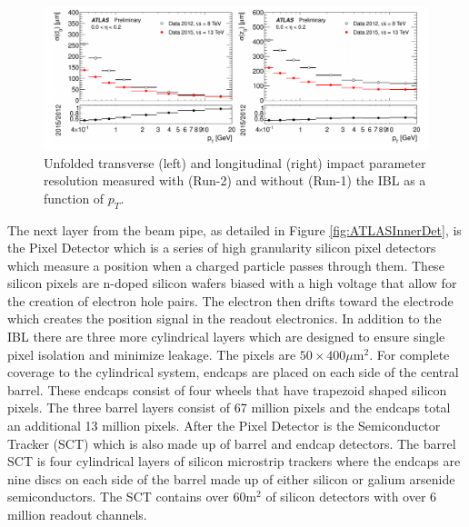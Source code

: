 \begin{figure}[ht!]
	\centering
	\includegraphics[width=\columnwidth]{../ThesisImages/LHCImages/tracking.png}
	\caption[Unfolded transverse (left) and longitudinal (right) impact parameter resolutions measured with (Run-2) and without (Run-1) the IBL as a function of $p_T$.]{Unfolded transverse (left) and longitudinal (right) impact parameter resolution measured with (Run-2) and without (Run-1) the IBL as a function of $p_T$\cite{Takubo:2017wvt}.
	}
	\label{fig:impParamIBL}
\end{figure}

The next layer from the beam pipe, as detailed in Figure \ref{fig:ATLASInnerDet}, is the Pixel Detector which is a series of high granularity silicon pixel detectors which measure a position when a charged particle passes through them.  These silicon pixels are n-doped silicon wafers biased with a high voltage that allow for the creation of electron hole pairs.  The electron then drifts toward the electrode which creates the position signal in the readout electronics.  In addition to the IBL there are three more cylindrical layers which are designed to ensure single pixel isolation and minimize leakage.  The pixels are $50 \times 400\mu\text{m}^2$.  For complete coverage to the cylindrical system, endcaps are placed on each side of the central barrel.  These endcaps consist of four wheels that have trapezoid shaped silicon pixels.  The three barrel layers consist of 67 million pixels and the endcaps total an additional 13 million pixels.
After the Pixel Detector is the Semiconductor Tracker (SCT) which is also made up of barrel and endcap detectors.  The barrel SCT is four cylindrical layers of silicon microstrip trackers where the endcaps are nine discs on each side of the barrel made up of either silicon or galium arsenide semiconductors.  The SCT contains over $60\text{m}^2$ of silicon detectors with over 6 million readout channels.

